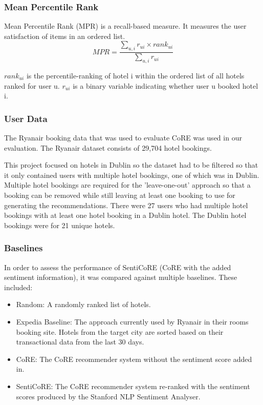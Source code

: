 \subsubsection{Mean Percentile Rank}
Mean Percentile Rank (MPR) is a recall-based measure. It measures the user satisfaction of items in an ordered list.
\begin{equation}
    MPR = \frac{ \sum_{u,i} r_{ui} \times rank_{ui} } {\sum_{u,i} r_{ui}}
\end{equation}

$rank_{ui}$ is the percentile-ranking of hotel i within the ordered list of all hotels ranked for user u. $r_{ui}$ is a binary variable indicating whether user u booked hotel i.

\subsubsection{User Data}
The Ryanair booking data that was used to evaluate CoRE \cite{core2019} was used in our evaluation. The Ryanair dataset consists of 29,704 hotel bookings.

This project focused on hotels in Dublin so the dataset had to be filtered so that it only contained users with multiple hotel bookings, one of which was in Dublin. Multiple hotel bookings are required for the 'leave-one-out' approach so that a booking can be removed while still leaving at least one booking to use for generating the recommendations. There were 27 users who had multiple hotel bookings with at least one hotel booking in a Dublin hotel. The Dublin hotel bookings were for 21 unique hotels. 

\subsubsection{Baselines}

In order to assess the performance of SentiCoRE (CoRE with the added sentiment information), it was compared against multiple baselines. These included: 
\begin{itemize}
    \item Random: A randomly ranked list of hotels.
    \item Expedia Baseline: The approach currently used by Ryanair in their rooms booking site. Hotels from the target city are sorted based on their transactional data from the last 30 days.
    \item CoRE: The CoRE recommender system without the sentiment score added in.
    \item SentiCoRE: The CoRE recommender system re-ranked with the sentiment scores produced by the Stanford NLP Sentiment Analyser.
\end{itemize}

